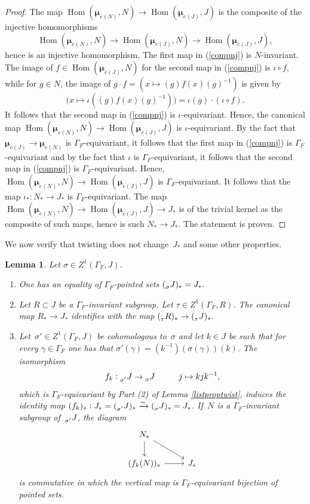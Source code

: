 \documentclass[a4paper,english,12pt]{amsart}
\newcommand{\sJ}{\prescript{}{\sigma}J}
\newcommand{\muu}{\boldsymbol{\mu}}
\DeclareMathOperator{\Hom}{Hom}
\newtheorem{lem}[equation]{Lemma}
\numberwithin{equation}{subsection}
\begin{document}
\begin{proof}
The map $\Hom(\muu_{e(N)}, N)\to\Hom(\muu_{e(J)},J)$ is the composite of the injective homomorphisms \begin{equation}\label{compnj}\tag{*}\Hom(\muu_{e(N)}, N)\to\Hom(\muu_{e(J)}, N)\to\Hom(\muu_{e(J)}, J), \end{equation} hence is an injective homomorphism. The first map in (\ref{compnj}) is $N$-invariant. The image of $f\in\Hom(\muu_{e(J)},N)$ for the second map in (\ref{compnj}) is $\iota\circ f$, while for $g\in N$, the image of $g\cdot f=(x\mapsto (g)f(x)(g)^{-1})$ is given by $$\big(x\mapsto \iota((g)f(x)(g)^{-1})\big)=\iota(g)\cdot (\iota\circ f).$$ It follows that the second map in (\ref{compnj}) is $\iota$-equivariant. Hence, the canonical map $\Hom(\muu_{e(N)},N)\to\Hom(\muu_{e(J)},J)$ is $\iota$-equivariant. By the fact that $\muu_{e(J)}\to\muu_{e(N)}$ is $\Gamma_F$-equivariant, it follows that the first map in (\ref{compnj}) is $\Gamma_F$-equivariant and by the fact that $\iota$ is $\Gamma_F$-equivariant, it follows that the second map in (\ref{compnj}) is $\Gamma_F$-equivariant. Hence, $\Hom(\muu_{e(N)}, N)\to\Hom(\muu_{e(J)}, J)$ is $\Gamma_F$-equivariant. It follows that the map $\iota_*:N_*\to J_*$ is $\Gamma_F$-equivariant. The map $\Hom(\muu_{e(N)}, N)\to\Hom(\muu_{e(J)}, J)\to J_*$ is of the trivial kernel as the composite of such maps, hence is such $N_*\to J_*$. The statement is proven. 
\end{proof}
We now verify that twisting does not change~$J_*$ and some other properties. 
\begin{lem}\label{twistsandstar} Let $\sigma\in Z^1(\Gamma_F, J)$.
\begin{enumerate}
\item One has an equality of $\Gamma_F$-pointed sets $(\prescript{}{\sigma}J)_*=J_*.$
\item Let $R\subset J$ be a $\Gamma_F$-invariant subgroup. Let $\tau\in Z^1(\Gamma_F, R)$. The canonical map $R_*\to J_*$ identifies with the map $(\prescript{}{\tau}R)_*\to (\prescript{}{\tau}J)_*.$
\item Let~$\sigma'\in  Z^1(\Gamma_F, J)$ be cohomologous to~$\sigma$ and let $k\in J$ be such that for every $\gamma\in\Gamma_F$ one has that $\sigma'(\gamma)=(k^{-1})(\sigma(\gamma))(k).$ The isomorphism $$f_k:\prescript{}{\sigma'}J\to\sJ\hspace{1cm}j\mapsto kjk^{-1},$$which is $\Gamma_F$-equivariant by Part (2) of Lemma \ref{listproptwist}, induces the identity map $(f_k)_*:J_*=(\prescript{}{\sigma'}J)_*\xrightarrow{\sim} (\sJ)_*=J_*$. If~$N$ is a $\Gamma_F$-invariant subgroup of~$\prescript{}{\sigma'}J$, the diagram %
\[\begin{tikzcd}
	{N_*} \\
	{(f_k(N))_*} & {J_*}
	\arrow[from=1-1, to=2-1]
	\arrow[from=1-1, to=2-2]
	\arrow[from=2-1, to=2-2]
\end{tikzcd}\] is commutative in which the vertical map is $\Gamma_F$-equivariant bijection of pointed sets.
\end{enumerate}
\end{lem}
\end{document}
